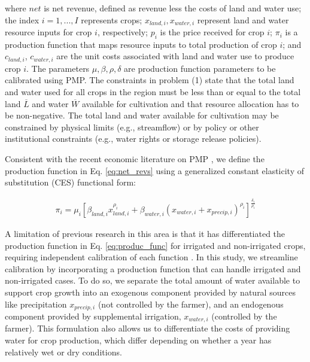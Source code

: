 \noindent where $net$ is net revenue, defined as revenue less the costs of land and water use; the index $i = 1,...,I$ represents crops; $x_{land,i}, x_{water,i}$ represent land and water resource inputs for crop $i$, respectively; $p_i$ is the price received for crop $i$; $\pi_i$ is a production function that maps resource inputs to total production of crop $i$; and $c_{land,i}$, $c_{water,i}$ are the unit costs associated with land and water use to produce crop $i$. The parameters $\mu, \beta, \rho, \delta$ are production function parameters to be calibrated using PMP. The constraints in problem (1) state that the total land and water used for all crops in the region must be less than or equal to the total land $\overline{L}$ and water $\overline{W}$ available for cultivation and that resource allocation has to be non-negative. The total land and water available for cultivation may be constrained by physical limits (e.g., streamflow) or by policy or other institutional constraints (e.g., water rights or storage release policies). 

Consistent with the recent economic literature on PMP \citep{Merel2011b}, we define the production function in Eq. \eqref{eq:net_revs} using a generalized constant elasticity of substitution (CES) functional form: 

\begin{align}\label{eq:produc_func}
    \pi_i = \mu_i \left[ \beta_{land,i} x_{land,i} ^ { \rho_i } + \beta_{water,i} (x_{water,i} + x_{precip,i}) ^ {\rho _i} \right]^{ \frac { \delta_i}{ \rho_i} }
\end{align}

A limitation of previous research in this area is that it has differentiated the production function in Eq. \eqref{eq:produc_func} for irrigated and non-irrigated crops, requiring independent calibration of each function \citep[e.g.][]{Maneta2009c}. In this study, we streamline calibration by incorporating a production function that can handle irrigated and non-irrigated cases. To do so, we separate the total amount of water available to support crop growth into an exogenous component provided by natural sources like precipitation $x_{precip,i}$ (not controlled by the farmer), and an endogenous component provided by supplemental irrigation, $x_{water,i}$ (controlled by the farmer). This formulation also allows us to differentiate the costs of providing water for crop production, which differ depending on whether a year has relatively wet or dry conditions. %

